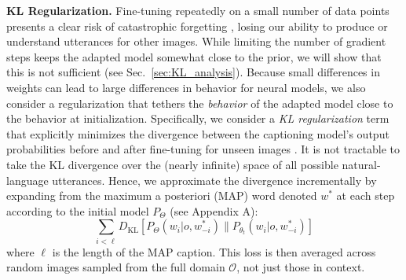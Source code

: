 \documentclass[11pt,a4paper]{article}
\newcommand{\sref}[1]{Sec.\ \ref{#1}}    %
\newcommand{\prg}[1]{\noindent\textbf{#1}} %
\begin{document}
\prg{KL Regularization.} 
Fine-tuning repeatedly on a small number of data points presents a clear risk of catastrophic forgetting \cite{robins_catastrophic_1995}, losing our ability to produce or understand utterances for other images. %
While limiting the number of gradient steps keeps the adapted model somewhat close to the prior, we will show that this is not sufficient (see \sref{sec:KL_analysis}).
Because small differences in weights can lead to large differences in behavior for neural models, we also consider a regularization that tethers the \emph{behavior} of the adapted model close to the behavior at initialization.
Specifically, we consider a \emph{KL regularization} term that explicitly minimizes the divergence between the captioning model's output probabilities before and after fine-tuning for unseen images \cite{yu2013kl, galashov_information_2018}.
It is not tractable to take the KL divergence over the (nearly infinite) space of all possible natural-language utterances. 
Hence, we approximate the divergence incrementally by expanding from the maximum a posteriori (MAP) word denoted $w^*$ at each step according to the initial model $P_{\Theta}$ (see Appendix A):
\begin{equation}
\sum_{i<\ell} 
  D_{\mathrm{KL}}
	\left[
	P_{\Theta}(w_i |o, w^*_{-i})
	\parallel
	P_{\theta_t}(w_i|o, w^*_{-i})
	\right]
\label{eq:speaker_reg}
\end{equation}
where $\ell$ is the length of the MAP caption.
This loss is then averaged across random images sampled from the full domain $\mathcal{O}$, not just those in context.

\end{document}
